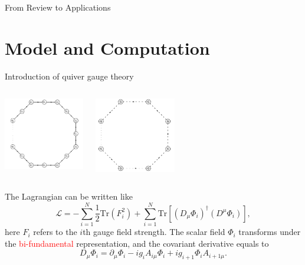 \documentclass{beamer}
\begin{document}
\begin{frame}{From Review to Applications}
\end{frame}

\section{Model and Computation}

\begin{frame}{Introduction of quiver gauge theory}
\vspace{1em}
\begin{columns}[c]
    \centering
    \includegraphics[width=100pt]{Moose.png}

    \centering

    \centering
    \includegraphics[width=100pt]{Moosed.jpeg}
\end{columns}


\pause
\raggedright
The Lagrangian can be written like
\begin{equation*}
    \mathcal{L} = -\sum_{i=1}^{N} \frac{1}{2} \mathrm{Tr}(F_i^2)
    + \sum_{i=1}^{N} \mathrm{Tr}\left[(D_\mu \Phi_i)^\dagger (D^\mu \Phi_i)\right],
\end{equation*}
here $F_i$ refers to the $i$th gauge field strength. The scalar field $\Phi_i$ transforms under the \textcolor{red}{bi-fundamental} representation, and the covariant derivative equals to
\begin{equation*}
    D_\mu \Phi_i = \partial_\mu \Phi_i - i g_i A_{i\mu} \Phi_i + i g_{i+1} \Phi_i A_{i+1\mu}.
\end{equation*}

\end{frame}
\end{document}
